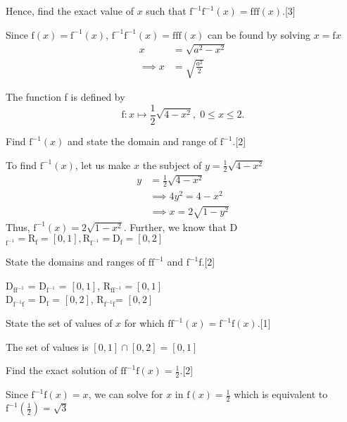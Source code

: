 \documentclass[12pt, a4 paper]{article}
\begin{document}
\begin{outline}[enumerate]
 \2 Hence, find the exact value of $x$ such that $\textrm{f}^{-1}\textrm{f}^{-1}(x)=\textrm{f}\textrm{f}\textrm{f}(x)$.\hfill[3]
 \begin{answer}
  Since $\textrm{f}(x)=\textrm{f}^{-1}(x)$, $\textrm{f}^{-1}\textrm{f}^{-1}(x)=\textrm{f}\textrm{f}\textrm{f}(x)$ can be found by solving $x=\mathrm{f}x$
  \begin{align*}
   x          & =\sqrt{a^2-x^2}       \\
   \implies x & =\sqrt{\frac{a^2}{2}}
  \end{align*}
 \end{answer}

 \1 The function f is defined by \[\textrm{f}:x \mapsto \frac{1}{2}\sqrt{4-x^2},\;0\leq x \leq2.\] %

 \2 Find $\textrm{f}^{-1}(x)$ and state the domain and range of $\textrm{f}^{-1}$.\hfill[2]
 \begin{answer}
  To find $\textrm{f}^{-1}(x)$, let us make $x$ the subject of $y=\frac{1}{2}\sqrt{4-x^2}$
  \begin{align*}
   y & =\frac{1}{2}\sqrt{4-x^2}   \\
     & \implies 4y^2=4-x^2        \\
     & \implies x = 2\sqrt{1-y^2}
  \end{align*}
  Thus, $\textrm{f}^{-1}(x)=2\sqrt{1-x^2}$. Further, we know that D$_{\textrm{f}^{-1}} = \textrm{R}_\textrm{f} = [0,1], \textrm{R}_{\textrm{f}^{-1}} = \textrm{D}_\textrm{f} = [0,2]$
 \end{answer}

 \2 State the domains and ranges of $\textrm{f}\textrm{f}^{-1}$ and $\textrm{f}^{-1}\textrm{f}$.\hfill[2]
 \begin{answer}
  D$_{\textrm{f}\textrm{f}^{-1}}$ = D$_{\textrm{f}^{-1}}$ = $[0,1]$, R$_{\textrm{f}\textrm{f}^{-1}} = [0,1]$ \\
  D$_{\textrm{f}^{-1}\textrm{f}}$ = D$_{\textrm{f}}$ = $[0,2]$, R$_{\textrm{f}^{-1}\textrm{f}}$= $[0,2]$
 \end{answer}

 \2 State the set of values of $x$ for which $\textrm{f}\textrm{f}^{-1}(x)=\textrm{f}^{-1}\textrm{f}(x)$.\hfill[1]
 \begin{answer}
  The set of values is $[0,1] \cap [0,2] = [0,1]$
 \end{answer}

 \2 Find the exact solution of $\textrm{f}\textrm{f}^{-1}\textrm{f}(x)=\frac{1}{2}$.\hfill[2]
 \begin{answer}
  Since $\textrm{f}^{-1}\textrm{f}(x)=x$, we can solve for $x$ in $\textrm{f}(x)=\frac{1}{2}$ which is equivalent to $\textrm{f}^{-1}(\frac{1}{2})=\sqrt{3}$
 \end{answer}


\end{outline}
\end{document}
